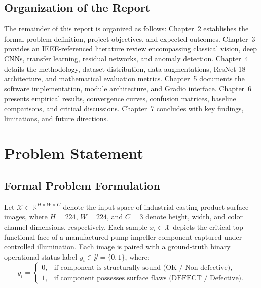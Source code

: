 \documentclass[12pt,a4paper]{report}
\begin{document}
\section{Organization of the Report}
The remainder of this report is organized as follows: Chapter~2 establishes the formal problem definition, project objectives, and expected outcomes. Chapter~3 provides an IEEE-referenced literature review encompassing classical vision, deep CNNs, transfer learning, residual networks, and anomaly detection. Chapter~4 details the methodology, dataset distribution, data augmentations, ResNet-18 architecture, and mathematical evaluation metrics. Chapter~5 documents the software implementation, module architecture, and Gradio interface. Chapter~6 presents empirical results, convergence curves, confusion matrices, baseline comparisons, and critical discussions. Chapter~7 concludes with key findings, limitations, and future directions.

\chapter{Problem Statement}

\section{Formal Problem Formulation}
Let $\mathcal{X} \subset \mathbb{R}^{H \times W \times C}$ denote the input space of industrial casting product surface images, where $H=224$, $W=224$, and $C=3$ denote height, width, and color channel dimensions, respectively. Each sample $x_i \in \mathcal{X}$ depicts the critical top functional face of a manufactured pump impeller component captured under controlled illumination. Each image is paired with a ground-truth binary operational status label $y_i \in \mathcal{Y} = \{0, 1\}$, where:
\begin{equation}
    y_i = \begin{cases}
        0, & \text{if component is structurally sound (OK / Non-defective)}, \\
        1, & \text{if component possesses surface flaws (DEFECT / Defective)}.
    \end{cases}
\end{equation}
\end{document}
